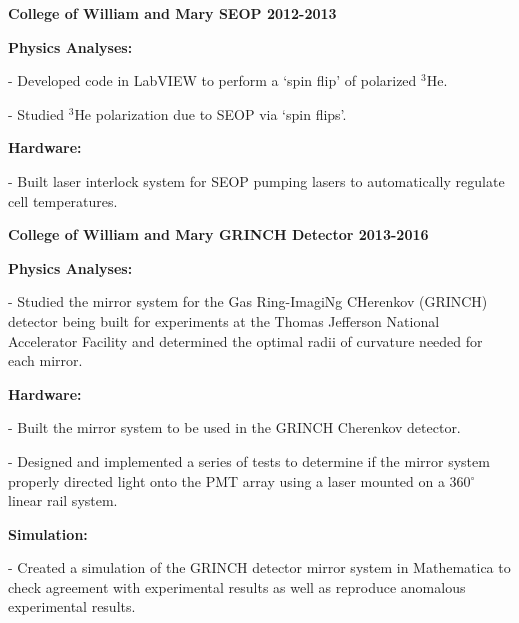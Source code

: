 \documentclass[letterpaper,10pt]{article}
\renewenvironment{itemize}{
  \begin{list}{}{
    \setlength{\leftmargin}{1.5em}
  }
}{
  \end{list}
}
\begin{document}
{\begin{itemize}
\item {\large {\bf College of William and Mary SEOP 2012-2013} }
 \begin{itemize}
  \item \textbf{Physics Analyses:}
   
    \begin{itemize}
     \item - Developed code in LabVIEW to perform a `spin flip' of polarized $^{3}$He.
     \item - Studied $^{3}$He polarization due to SEOP via `spin flips'.
     \end{itemize}

  \item \textbf{Hardware:}
    \begin{itemize}
     \item - Built laser interlock system for SEOP pumping lasers to automatically regulate cell temperatures. 
    \end{itemize}
 
\end{itemize}

\item {\large {\bf College of William and Mary GRINCH Detector 2013-2016} }
 \begin{itemize}\itemsep1pt \parskip0pt 
  \item \textbf{Physics Analyses:}
   
    \begin{itemize}\itemsep1pt \parskip0pt 
     \item - Studied the mirror system for the Gas Ring-ImagiNg CHerenkov (GRINCH) detector being built for experiments at the Thomas Jefferson National Accelerator Facility and determined the optimal radii of curvature needed for each mirror.
     \end{itemize}

  \item \textbf{Hardware:}
    \begin{itemize}\itemsep1pt \parskip0pt 
     \item - Built the mirror system to be used in the GRINCH Cherenkov detector.
     \item - Designed and implemented a series of tests to determine if the mirror system properly directed light onto the PMT array using a laser mounted on a 360$^\circ$ linear rail system.
    \end{itemize}
    
   \item \textbf{Simulation:}
     \begin{itemize}\itemsep1pt \parskip0pt 
      \item - Created a simulation of the GRINCH detector mirror system in Mathematica to check agreement with experimental results as well as reproduce anomalous experimental results.
     \end{itemize} 
 

\end{itemize}
\end{itemize}}
\end{document}
